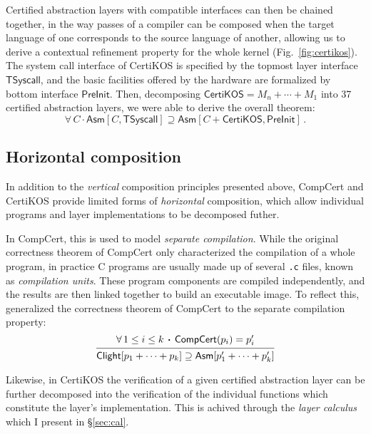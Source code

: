 \documentclass[draft,11pt]{report}
\theoremstyle{definition}
\newcommand{\kw}[1]{\ensuremath{ \mathsf{#1} }}
\newcommand{\bdot}{\boldsymbol{\cdot}}
\begin{document}
Certified abstraction layers
with compatible interfaces can then be chained together,
in the way passes of a compiler
can be composed when the target language of one
corresponds to the source language of another,
allowing us to derive a contextual refinement property
for the whole kernel (Fig.~\ref{fig:certikos}).
The system call interface of CertiKOS is specified
by the topmost layer interface $\kw{TSyscall}$,
and the basic facilities offered by the hardware
are formalized by bottom interface $\kw{PreInit}$.
Then, decomposing $\kw{CertiKOS} = M_n + \cdots + M_1$
into 37 certified abstraction layers,
we were able to derive the overall theorem:
\[
  \forall \, C \, \bdot \,
    \kw{Asm}[C, \kw{TSyscall}]
    \supseteq
    \kw{Asm}[C + \kw{CertiKOS}, \kw{PreInit}] \,.
\]


\subsection{Horizontal composition} %

In addition to
the \emph{vertical} composition principles presented above,
CompCert and CertiKOS provide limited forms of
\emph{horizontal} composition,
which allow individual programs and layer implementations
to be decomposed futher.

In CompCert,
this is used to model \emph{separate compilation}.
While the original correctness theorem of CompCert
only characterized the compilation of a whole program,
in practice C programs are usually made up of
several \texttt{.c} files, known as \emph{compilation units}.
These program components are compiled independently,
and the results are then linked together to build
an executable image.
To reflect this,
\citet{sepcompcert} generalized the correctness theorem of CompCert
to the separate compilation property:
\[
  \begin{prooftree}
    \hypo{\forall \, 1 \le i \le k \, \bdot \,
      \kw{CompCert}(p_i) = p_i'}
    \infer1{\kw{Clight}[p_1 + \cdots + p_k] \supseteq
      \kw{Asm}[p_1' + \cdots + p_k']}
  \end{prooftree}
\]

Likewise,
in CertiKOS the verification of a given
certified abstraction layer
can be further decomposed into
the verification of the individual functions
which constitute the layer's implementation.
This is achived through the \emph{layer calculus}
which I present in \S\ref{sec:cal}.

\end{document}

